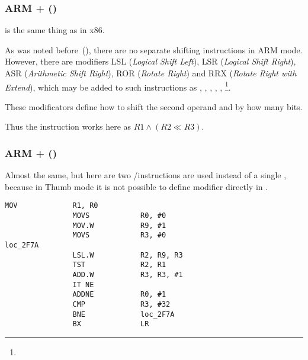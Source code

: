 \subsubsection{ARM + \OptimizingXcodeIV (\ARMMode)}



\TST is the same thing as \TEST in x86.

As was noted before~(),
there are no separate shifting instructions in ARM mode.
However, there are modifiers 
LSL (\emph{Logical Shift Left}), 
LSR (\emph{Logical Shift Right}), 
ASR (\emph{Arithmetic Shift Right}), 
ROR (\emph{Rotate Right}) and
RRX (\emph{Rotate Right with Extend}), which may be added to such instructions as \MOV, \TST,
\CMP, \ADD, \SUB, \RSB\footnote{\DataProcessingInstructionsFootNote}.

These modificators define how to shift the second operand and by how many bits.

Thus the  instruction works here as $R1 \land (R2 \ll R3)$.

\subsubsection{ARM + \OptimizingXcodeIV (\ThumbTwoMode)}

Almost the same, but here are two /\TST instructions are used instead of a single \TST, because in Thumb mode it is not
possible to define \LSL modifier directly in \TST.

\begin{lstlisting}[label=ARM_leaf_example5,style=customasmARM]
                MOV             R1, R0
                MOVS            R0, #0
                MOV.W           R9, #1
                MOVS            R3, #0
loc_2F7A
                LSL.W           R2, R9, R3
                TST             R2, R1
                ADD.W           R3, R3, #1
                IT NE
                ADDNE           R0, #1
                CMP             R3, #32
                BNE             loc_2F7A
                BX              LR
\end{lstlisting}

